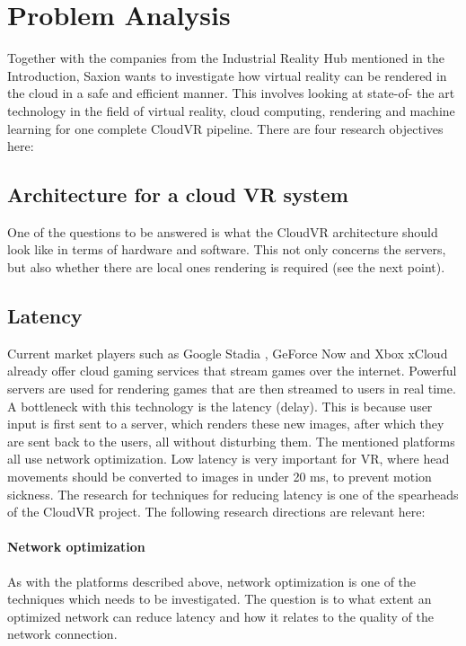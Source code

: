 \section{Problem Analysis}

Together with the companies from the Industrial Reality Hub mentioned in the Introduction, Saxion wants to investigate how virtual reality
can be rendered in the cloud in a safe and efficient manner. This involves looking at state-of-
the art technology in the field of virtual reality, cloud computing, rendering and machine learning for one
complete CloudVR pipeline. There are four research objectives here:

\subsection{Architecture for a cloud VR system}
One of the questions to be answered is what the CloudVR architecture should look like
in terms of hardware and software. This not only concerns the servers, but also whether there are local ones
rendering is required (see the next point).

\subsection{Latency}
Current market players such as Google Stadia \parencite{stadia}, GeForce Now \parencite{geforcenow} and Xbox xCloud \parencite{xcloud} already offer cloud gaming services that stream games over the internet. Powerful servers are used for rendering games that are then streamed to users in real time. A bottleneck with this technology is the latency (delay). This is because user input is first sent to a server, which renders these new images, after which they are sent back to the users, all without disturbing them. The mentioned platforms all use network optimization. Low latency is very important for VR, where head movements should be converted to images in under 20 \acrfull{ms}, to prevent motion sickness. The research for techniques for reducing latency is one of the spearheads of the CloudVR project. The following research directions are relevant here:

\paragraph{Network optimization}
As with the platforms described above, network optimization is one of the techniques
which needs to be investigated. The question is to what extent an optimized network
can reduce latency and how it relates to the quality of the network connection.
